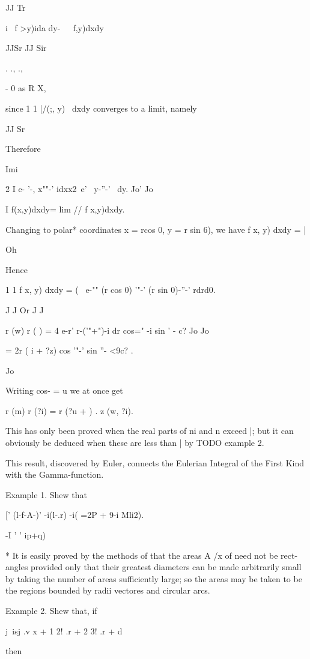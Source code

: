  JJ Tr

i \ f >y)ida dy-\ \ \ f,y)dxdy\

JJSr JJ Sir

  . ., .,

- 0 as R X,

since 1 1 |/(;, y) \ dxdy converges to a limit, namely

JJ Sr

Therefore

Imi

2 I e- '-, x""-' idxx2\ e' \ y-''-' \ dy. Jo' Jo

I f(x,y)dxdy= lim // f x,y)dxdy.

Changing to polar* coordinates x = rcos 0, y = r sin 6), we have f x,
y) dxdy = |

Oh

Hence

1 1 f x, y) dxdy = ( \ e-"" (r cos 0) '"-' (r sin 0)-''-' rdrd0.

J J Or J J

r (w) r ( ) = 4 e-r' r-('"+")-i dr cos=" -i sin ' - c? Jo Jo

= 2r ( i + ?z) cos '"-' sin ''- <9c? .

Jo

Writing cos- = u we at once get

r (m) r (?i) = r (?u + ) . z (w, ?i).

This has only been proved when the real parts of ni and n exceed |;
but it can obviously be deduced when these are less than | by TODO
example 2.

This result, discovered by Euler, connects the Eulerian Integral of
the First Kind with the Gamma-function.

Example 1. Shew that

[' (l-f-A-)' -i(l-.r) -i( =2P + 9-i Mli2).

  -I ' ' ip+q)

  * It is easily proved by the methods of  that the areas A /x of
   need not be rect- angles provided only that their greatest
diameters can be made arbitrarily small by taking the number of areas
sufficiently large; so the areas may be taken to be the regions
bounded by radii vectores and circular arcs.

%
%

Example 2. Shew that, if

j\ isj .v x + 1 2! .r + 2 3! .r + d

then


